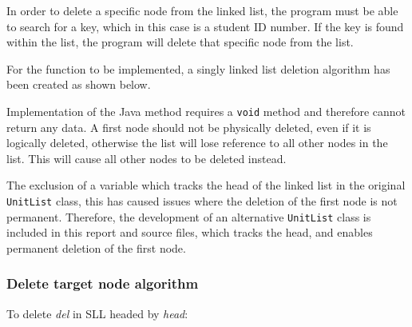 In order to delete a specific node from the linked list, the program must be able to search for a key, which in this case is a student ID number. If the key is found within the list, the program will delete that specific node from the list.

For the function to be implemented, a singly linked list deletion algorithm has been created as shown below.

Implementation of the Java method requires a \texttt{void} method and therefore cannot return any data. A first node should not be physically deleted, even if it is logically deleted, otherwise the list will lose reference to all other nodes in the list. This will cause all other nodes to be deleted instead.

The exclusion of a variable which tracks the head of the linked list in the original \texttt{UnitList} class, this has caused issues where the deletion of the first node is not permanent. Therefore, the development of an alternative \texttt{UnitList} class is included in this report and source files, which tracks the head, and enables permanent deletion of the first node.

\subsubsection{Delete target node algorithm}



To delete \emph{del} in SLL headed by \emph{head}:

